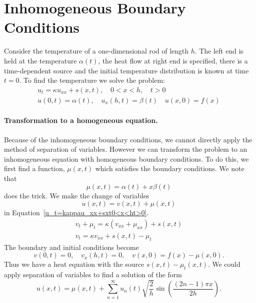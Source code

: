 \section{Inhomogeneous Boundary Conditions}



Consider the temperature of a one-dimensional rod of length $h$.  
The left end is held at the temperature $\alpha(t)$, 
the heat flow at right end is specified,
there is a time-dependent source and 
the initial temperature distribution is known at time $t = 0$.  To find
the temperature we solve the problem:
\begin{gather}
  \label{u_t=kappau_xx+sxt0<x<ht>0}
  u_t = \kappa u_{x x} + s(x,t), \quad 
  0 < x < h,\quad t > 0 \\
  \nonumber
  u(0,t) = \alpha(t), \quad u_x(h,t) = \beta(t) \quad
  u(x,0) = f(x)
\end{gather}


\paragraph{Transformation to a homogeneous equation.}
Because of the inhomogeneous boundary conditions, we cannot directly
apply the method of separation of variables.  However we can transform
the problem to an inhomogeneous equation with homogeneous boundary conditions.
To do this, we first find a function, $\mu(x, t)$ which satisfies the
boundary conditions.  We note that
\[
\mu(x,t) = \alpha(t) + x \beta(t)
\]
does the trick.  We make the change of variables
\[
u(x,t) = v(x,t) + \mu(x,t)
\]
in Equation~\ref{u_t=kappau_xx+sxt0<x<ht>0}.
\begin{gather*} 
  v_t + \mu_t = \kappa \left( v_{x x} + \mu_{x x} \right) + s(x,t) \\
  v_t = \kappa v_{x x} + s(x,t) - \mu_t
\end{gather*}
The boundary and initial conditions become
\[ 
v(0,t) = 0, \quad v_x(h,t) = 0, \quad v(x,0) = f(x) - \mu(x,0).
\]
Thus we have a heat equation with the source $s(x,t) -\mu_t(x,t)$.  We could 
apply separation of variables to find a solution of the form
\[
u(x,t) = \mu(x,t) 
+ \sum_{n=1}^\infty u_n(t) \sqrt{ \frac{2}{h} } 
\sin \left( \frac{(2n-1) \pi x}{2 h} \right).
\]


